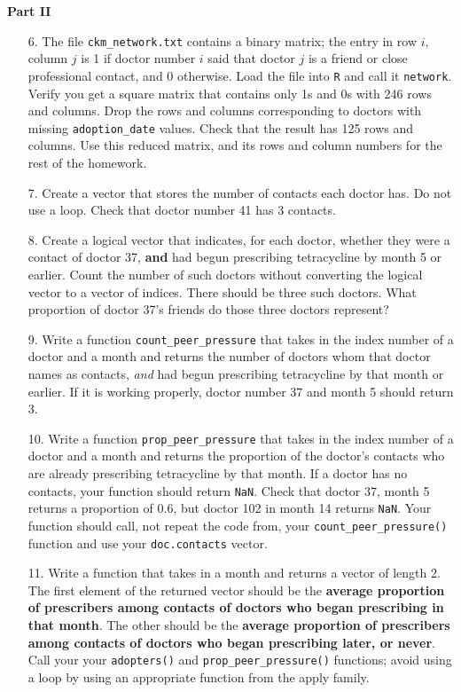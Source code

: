 \documentclass[12pt, leqno]{article}
\begin{document}
\textbf{Part II}

\begin{enumerate}

\item[6.] The file \texttt{ckm\_network.txt} contains a binary matrix; the entry in row $i$, column $j$ is 1 if doctor number $i$ said that doctor $j$ is a friend or close professional contact, and 0 otherwise.  Load the file into \texttt{R} and call it \texttt{network}.  Verify you get a square matrix that contains only 1s and 0s with 246 rows and columns.  Drop the rows and columns corresponding to doctors with missing \texttt{adoption\_date} values.  Check that the result has 125 rows and columns.  Use this reduced matrix, and its rows and column numbers for the rest of the homework.

\item[7.] Create a vector that stores the number of contacts each doctor has.  Do not use a loop.  Check that doctor number 41 has 3 contacts.

\item[8.] Create a logical vector that indicates, for each doctor, whether they were a contact of doctor 37, \textbf{and} had begun prescribing tetracycline by month 5 or earlier.  Count the number of such doctors without converting the logical vector to a vector of indices.  There should be three such doctors.  What proportion of doctor 37's friends do those three doctors represent?

\item[9.] Write a function \texttt{count\_peer\_pressure} that takes in the index number of a doctor and a month and returns the number of doctors whom that doctor names as contacts, \emph{and} had begun prescribing tetracycline by that month or earlier.  If it is working properly, doctor number 37 and month 5 should return 3.

\item[10.] Write a function \texttt{prop\_peer\_pressure} that takes in the index number of a doctor and a month and returns the proportion of the doctor's contacts who are already prescribing tetracycline by that month.  If a doctor has no contacts, your function should return \texttt{NaN}.  Check that doctor 37, month 5 returns a proportion of 0.6, but doctor 102 in month 14 returns \texttt{NaN}.  Your function should call, not repeat the code from, your \texttt{count\_peer\_pressure()} function and use your \texttt{doc.contacts} vector.

\item[11.] Write a function that takes in a month and returns a vector of length 2.  The first element of the returned vector should be the\textbf{ average proportion of prescribers among contacts of doctors who \textbf{began} prescribing in that month}.  The other should be the \textbf{average proportion of prescribers among contacts of doctors who began prescribing \textbf{later}, or never}.  Call your your \texttt{adopters()} and \texttt{prop\_peer\_pressure()} functions; avoid using a loop by using an appropriate function from the apply family.


\end{enumerate}
\end{document}
